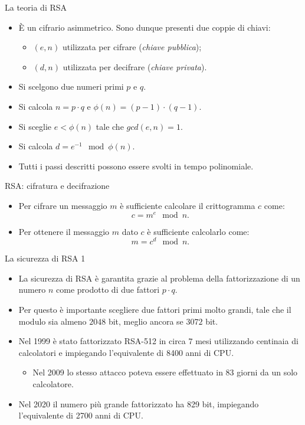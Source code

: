 \documentclass[11pt,svgnames,smaller,aspectratio=169,italian]{beamer}
\begin{document}
\begin{frame}{La teoria di RSA} %
	\begin{itemize}
		\item È un cifrario asimmetrico. Sono dunque presenti due coppie di chiavi:
		\begin{itemize}
			\item $(e, n)$ utilizzata per cifrare (\emph{chiave pubblica});
			\item $(d, n)$ utilizzata per decifrare (\emph{chiave privata}).
		\end{itemize}
		\item Si scelgono due numeri primi $p$ e $q$.
		\item Si calcola $n = p \cdot q$ e $\phi(n) = (p - 1) \cdot (q - 1)$.
		\item Si sceglie $e < \phi(n)$ tale che $gcd(e, n) = 1$.
		\item Si calcola $d = e^{-1} \mod \phi(n)$.
		\item Tutti i passi descritti possono essere svolti in tempo polinomiale.
	\end{itemize}
\end{frame}

\begin{frame}{RSA: cifratura e decifrazione}
	\begin{itemize}
		\item Per cifrare un messaggio $m$ è sufficiente calcolare il crittogramma $c$ come:
		\begin{equation*}
			c = m^{e} \mod n.
		\end{equation*}
		\item Per ottenere il messaggio $m$ dato $c$ è sufficiente calcolarlo come:
		\begin{equation*}
			m = c^{d} \mod n.
		\end{equation*}
		
	\end{itemize}
	
\end{frame}

\begin{frame}{La sicurezza di RSA 1} %
	\begin{itemize}
		\item La sicurezza di RSA è garantita grazie al problema della fattorizzazione di un numero $n$ come prodotto di due fattori $p \cdot q$.
		\item Per questo è importante scegliere due fattori primi molto grandi, tale che il modulo sia almeno $2048$ bit, meglio ancora se $3072$ bit.
		\item Nel 1999 è stato fattorizzato RSA-512 in circa $7$ mesi utilizzando centinaia di calcolatori e impiegando l'equivalente di 8400 anni di CPU.
			\begin{itemize}
				\item Nel 2009 lo stesso attacco poteva essere effettuato in 83 giorni da un solo calcolatore.
			\end{itemize}
		\item Nel 2020 il numero più grande fattorizzato ha 829 bit, impiegando l'equivalente di 2700 anni di CPU.
	\end{itemize}
\end{frame}
\end{document}

